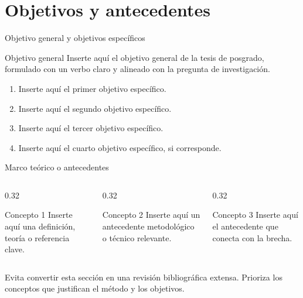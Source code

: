 \section{Objetivos y antecedentes}

\begin{frame}{Objetivo general y objetivos específicos}
  \begin{UCBlock}{Objetivo general}
    Inserte aquí el objetivo general de la tesis de posgrado, formulado con un verbo claro y alineado con la pregunta de investigación.
  \end{UCBlock}
  \vspace{0.08cm}
  \begin{enumerate}
    \item Inserte aquí el primer objetivo específico.
    \item Inserte aquí el segundo objetivo específico.
    \item Inserte aquí el tercer objetivo específico.
    \item Inserte aquí el cuarto objetivo específico, si corresponde.
  \end{enumerate}
\end{frame}

\begin{frame}{Marco teórico o antecedentes}
  \begin{columns}[T,onlytextwidth]
    \begin{column}{0.32\textwidth}
      \begin{UCBlock}{Concepto 1}
        Inserte aquí una definición, teoría o referencia clave.
      \end{UCBlock}
    \end{column}
    \begin{column}{0.32\textwidth}
      \begin{UCBlock}{Concepto 2}
        Inserte aquí un antecedente metodológico o técnico relevante.
      \end{UCBlock}
    \end{column}
    \begin{column}{0.32\textwidth}
      \begin{UCBlock}{Concepto 3}
        Inserte aquí el antecedente que conecta con la brecha.
      \end{UCBlock}
    \end{column}
  \end{columns}
  \begin{UCKeyPoint}
    Evita convertir esta sección en una revisión bibliográfica extensa. Prioriza los conceptos que justifican el método y los objetivos.
  \end{UCKeyPoint}
\end{frame}

